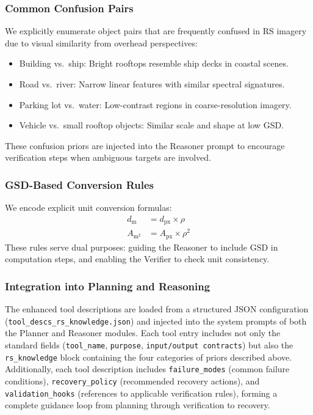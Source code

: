 \documentclass[journal]{IEEEtran}
\begin{document}
\subsubsection{Common Confusion Pairs}
We explicitly enumerate object pairs that are frequently confused in RS imagery due to visual similarity from overhead perspectives:
\begin{itemize}[leftmargin=*]
    \item Building vs.\ ship: Bright rooftops resemble ship decks in coastal scenes.
    \item Road vs.\ river: Narrow linear features with similar spectral signatures.
    \item Parking lot vs.\ water: Low-contrast regions in coarse-resolution imagery.
    \item Vehicle vs.\ small rooftop objects: Similar scale and shape at low GSD.
\end{itemize}
These confusion priors are injected into the Reasoner prompt to encourage verification steps when ambiguous targets are involved.

\subsubsection{GSD-Based Conversion Rules}
We encode explicit unit conversion formulas:
\begin{align}
    d_{\text{m}} &= d_{\text{px}} \times \rho \label{eq:gsd_dist}\\
    A_{\text{m}^2} &= A_{\text{px}} \times \rho^2 \label{eq:gsd_area}
\end{align}
These rules serve dual purposes: guiding the Reasoner to include GSD in computation steps, and enabling the Verifier to check unit consistency.

\subsubsection{Integration into Planning and Reasoning}
The enhanced tool descriptions are loaded from a structured JSON configuration (\texttt{tool\_descs\_rs\_knowledge.json}) and injected into the system prompts of both the Planner and Reasoner modules.
Each tool entry includes not only the standard fields (\texttt{tool\_name}, \texttt{purpose}, \texttt{input/output contracts}) but also the \texttt{rs\_knowledge} block containing the four categories of priors described above.
Additionally, each tool description includes \texttt{failure\_modes} (common failure conditions), \texttt{recovery\_policy} (recommended recovery actions), and \texttt{validation\_hooks} (references to applicable verification rules), forming a complete guidance loop from planning through verification to recovery.
\end{document}

